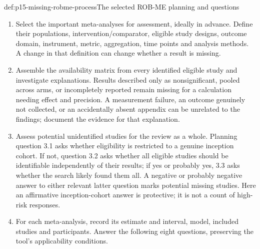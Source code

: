 \begin{hbmethod}{def:p15-missing-robme-process}{The selected ROB-ME planning and questions}
\begin{enumerate}
\item Select the important meta-analyses for assessment, ideally in
      advance. Define their populations, intervention/comparator,
      eligible study designs, outcome domain, instrument, metric,
      aggregation, time points and analysis methods. A change in that
      definition can change whether a result is missing.
\item Assemble the availability matrix from every identified eligible
      study and investigate explanations. Results described only as
      nonsignificant, pooled across arms, or incompletely reported
      remain missing for a calculation needing effect and precision.
      A measurement failure, an outcome genuinely not collected, or
      an accidentally absent appendix can be unrelated to the findings;
      document the evidence for that explanation.
\item Assess potential unidentified studies for the review as a whole.
      Planning question 3.1 asks whether eligibility is restricted to
      a genuine inception cohort. If not, question 3.2 asks whether
      all eligible studies should be identifiable independently of
      their results; if yes or probably yes, 3.3 asks whether the search
      likely found them all. A negative or probably negative answer
      to either relevant latter question marks potential missing studies.
      Here an affirmative inception-cohort answer is protective; it is
      not a count of high-risk responses.
\item For each meta-analysis, record its estimate and interval, model,
      included studies and participants. Answer the following eight
      questions, preserving the tool's applicability conditions.
\end{enumerate}


\end{hbmethod}
